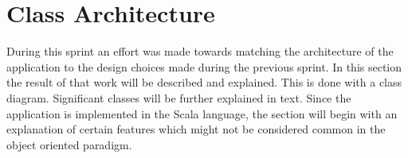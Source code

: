 \section{Class Architecture}

During this sprint an effort was made towards matching the architecture of the application to the design choices made during the previous sprint. In this section the result of that work will be described and explained. This is done with a class diagram. Significant classes will be further explained in text. Since the application is implemented in the Scala language, the section will begin with an explanation of certain features which might not be considered common in the object oriented paradigm.





